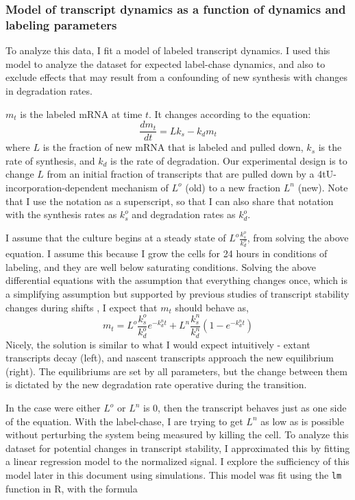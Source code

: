\subsubsection{Model of transcript dynamics as a function of 
dynamics and labeling parameters}

To analyze this data, I fit a model of 
labeled transcript dynamics.
I used this model to analyze the dataset for expected label-chase
dynamics, and also to exclude effects that may result from a
confounding of new synthesis with changes in degradation rates.

\(m_t\) is the labeled mRNA at time \(t\). It changes according to the
equation: \[ \frac{d m_t}{dt} = L k_s - k_d m_t\] where \(L\) is the
fraction of new mRNA that is labeled and pulled down, \(k_s\) is the
rate of synthesis, and \(k_d\) is the rate of degradation. Our
experimental design is to change \(L\) from an initial fraction of
transcripts that are pulled down by a 4tU-incorporation-dependent
mechanism of \(L^o\) (old) to a new fraction \(L^n\) (new). Note that
I use the notation as a superscript, so that I can also share that
notation with the synthesis rates as \(k_s^o\) and degradation rates as
\(k_d^o\).

I assume that the culture begins at a steady state of
\(L^{o}\frac{k_s^{o}}{k_d^{o}}\), from solving the above equation.
I assume this because I grow the cells for 24 hours in conditions
of labeling, and they are well below saturating conditions.
Solving the above differential equations with the assumption that
everything changes once, which is a simplifying assumption but supported
by previous studies of transcript stability changes during shifts
\parencite{perez2013eukaryotic}, I expect that \(m_t\) should behave
as, \[ m_t = L^o \frac{k_s^o}{k_d^o} e^{-k_d^n t} + 
  L^n\frac{k_s^n}{k_d^n}(1-e^{-k_d^n t}) \] Nicely, the solution is
similar to what I would expect intuitively - extant transcripts decay
(left), and nascent transcripts approach the new equilibrium (right).
The equilibriums are set by all parameters, but the change between them
is dictated by the new degradation rate operative during the transition.

In the case were either \(L^o\) or \(L^n\) is 0, then the transcript
behaves just as one side of the equation. With the label-chase, I are
trying to get \(L^n\) as low as is possible without perturbing the
system being measured by killing the cell.
To analyze this dataset for potential changes in transcript stability,
I approximated this by fitting a linear regression model to the
normalized signal. I explore the sufficiency of this model later in
this document using simulations. This model was fit using the
\texttt{lm} function in R, with the formula

